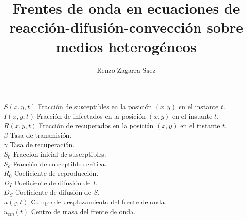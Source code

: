 \documentclass[12pt,screen,twoside]{ibtesis}
\title{Frentes de onda en ecuaciones de reacción-difusión-convección sobre medios heterogéneos}
\author{Renzo Zagarra Saez}
\begin{document}

\begin{preliminary}



\tableofcontents 

\begin{abreviaturas}
  \noindent
  {$S(x,y,t)$ \hspace*{.3cm} Fracción de susceptibles en la posición $(x,y)$ en el instante $t$.\\
  $I(x,y,t)$ \hspace*{.3cm} Fracción de infectados en la posición $(x,y)$ en el instante $t$.\\
  $R(x,y,t)$ \hspace*{.3cm} Fracción de recuperados en la posición $(x,y)$ en el instante $t$.\\
  $\beta$ \hspace*{.3cm} Tasa de transmisión.\\
  $\gamma$ \hspace*{.3cm} Tasa de recuperación.\\
  $S_0$ \hspace*{.3cm} Fracción inicial de susceptibles.\\
  $S_c$ \hspace*{.3cm} Fracción de susceptibles crítica.\\
  $R_0$ \hspace*{.3cm} Coeficiente de reproducción.\\
  $D_{I}$ \hspace*{.3cm} Coeficiente de difusión de $I$.\\
  $D_{S}$ \hspace*{.3cm} Coeficiente de difusión de $S$.\\
  $u(y,t)$ \hspace*{.3cm} Campo de desplazamiento del frente de onda.\\
  $u_{cm}(t)$ \hspace*{.3cm} Centro de masa del frente de onda.\\
}
\end{abreviaturas}
\end{preliminary}
\end{document}
